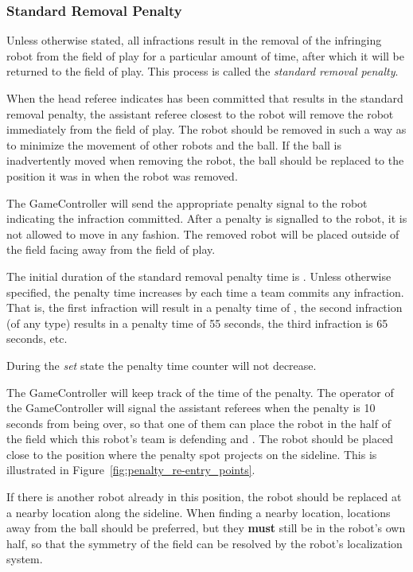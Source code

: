 \subsubsection{Standard Removal Penalty}
\label{sec:removal_penalty}

Unless otherwise stated, all infractions result in the removal of the infringing robot from the field of play for a particular amount of time, after which it will be returned to the field of play. This process is called the \textit{standard removal penalty}.

When the head referee indicates  has been committed that results in the standard removal penalty, the assistant referee closest to the robot will remove the robot immediately from the field of play. The robot should be removed in such a way as to minimize the movement of other robots and the ball. If the ball is inadvertently moved when removing the robot, the ball should be replaced to the position it was in when the robot was removed.

The GameController will send the appropriate penalty signal to the robot indicating the infraction committed. After a penalty is signalled to the robot, it is not allowed to move in any fashion. The removed robot will be placed outside of the field facing away from the field of play.

The initial duration of the standard removal penalty time is \StandardPenaltyTime.
Unless otherwise specified, the penalty time increases by \StandardPenaltyIncrease each time a team commits any infraction.
That is, the first infraction will result in a penalty time of \StandardPenaltyTime, the second infraction (of any type) results in a penalty time of 55 seconds, the third infraction is 65 seconds, etc.

During the \emph{set} state the penalty time counter will not decrease.

The GameController will keep track of the time of the penalty. The operator of the GameController will signal the assistant referees when the penalty is 10 seconds from being over, so that one of them can place the robot in the half of the field which this robot's team is defending and . The robot should be placed close to the position where the penalty spot projects on the sideline. This is illustrated in Figure~\ref{fig:penalty_re-entry_points}.

If there is another robot already in this position, the robot should be replaced at a nearby location along the sideline. When finding a nearby location, locations away from the ball should be preferred, but they \textbf{must} still be in the robot's own half, so that the symmetry of the field can be resolved by the robot's localization system.

